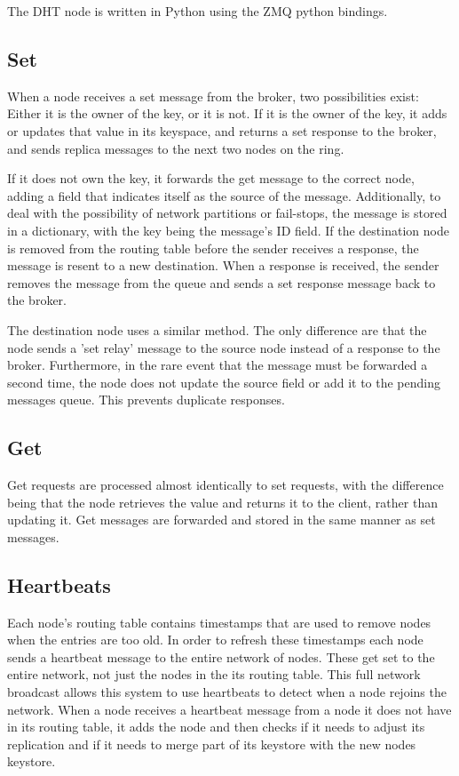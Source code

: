 \documentclass[11pt]{article}
\begin{document}
The DHT node is written in Python using the ZMQ python bindings. 

\subsection{Set}\label{sec:get}

When a node receives a set message from the broker, two possibilities exist: Either it is the owner of the key, or it is not. If it is the owner of the key, it adds or updates that value in its keyspace, and returns a set response to the broker, and sends replica messages to the next two nodes on the ring.

If it does not own the key, it forwards the get message to the correct node, adding a field that indicates itself as the source of the message. Additionally, to deal with the possibility of network partitions or fail-stops, the message is stored in a dictionary, with the key being the message's ID field. If the destination node is removed from the routing table before the sender receives a response, the message is resent to a new destination. When a response is received, the sender removes the message from the queue and sends a set response message back to the broker.

The destination node uses a similar method. The only difference are that the node sends a 'set relay' message to the source node instead of a response to the broker. Furthermore, in the rare event that the message must be forwarded a second time, the node does not update the source field or add it to the pending messages queue. This prevents duplicate responses.

\subsection{Get}\label{sec:get}

Get requests are processed almost identically to set requests, with the difference being that the node retrieves the value and returns it to the client, rather than updating it. Get messages are forwarded and stored in the same manner as set messages.

\subsection{Heartbeats}\label{sec:HB}

Each node's routing table contains timestamps that are used to remove nodes when the entries are too old. In order to refresh these timestamps each node sends a heartbeat message to the entire network of nodes. These get set to the entire network, not just the nodes in the its routing table. This full network broadcast allows this system to use heartbeats to detect when a node rejoins the network. When a node receives a heartbeat message from a node it does not have in its routing table, it adds the node and then checks if it needs to adjust its replication and if it needs to merge part of its keystore with the new nodes keystore.
\end{document}
